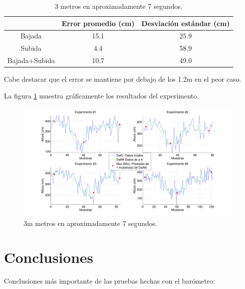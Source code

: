 \documentclass[main]{subfiles}
\begin{document}
\begin{table}[H]
\centering
\begin{tabular}{c|c|c|} 
\cline{2-3}
  & Error promedio (cm) & Desviación estándar (cm)\\ \hline
\multicolumn{1}{|c|}{Bajada} & 15.1 & 25.9 \\ \hline
\multicolumn{1}{|c|}{Subida} & 4.4 &  58.9 \\ \hline
\multicolumn{1}{|c|}{Bajada+Subida} & 10.7 & 49.0 \\ \hline
\end{tabular}
\caption{3 metros en aproximadamente 7 segundos.}
\label{tab:ruido-rms}
\end{table}

Cabe destacar que el error se mantiene por debajo de los 1.2m en el peor caso.

La figura \ref{fig:estante_veloz.pdf} muestra gráficamente los resultados del experimento.

\begin{figure}[H]
\hspace{-90pt}
  \includegraphics[width=1.4\textwidth]{./pics_barom/estante_veloz.pdf}
  \caption{3m metros en aproximadamente 7 segundos.}
  \label{fig:estante_veloz.pdf}
\end{figure}

\newpage
\section{Conclusiones}
\label{sec:conclusiones}

Conclusiones más importante de las pruebas hechas con el barómetro:
\end{document}
